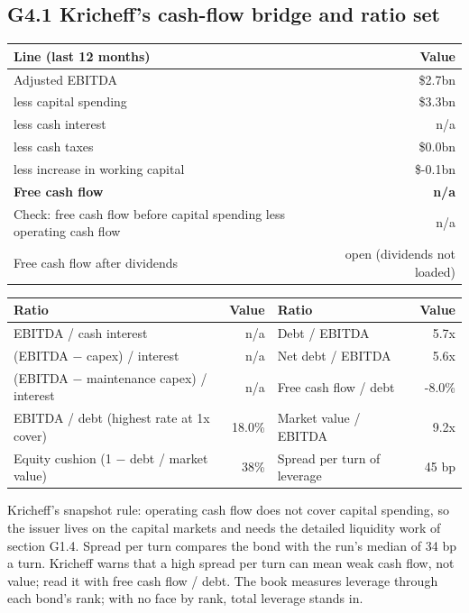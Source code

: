 \documentclass[11pt,a4paper]{article}
\begin{document}
\subsection*{G4.1 Kricheff's cash-flow bridge and ratio set}
\begin{center}\footnotesize\setlength{\tabcolsep}{3.5pt}\begin{tabular}{@{}lr@{}}\toprule
Line (last 12 months) & Value \\\midrule
Adjusted EBITDA & \$2.7bn \\
less capital spending & \$3.3bn \\
less cash interest & n/a \\
less cash taxes & \$0.0bn \\
less increase in working capital & \$-0.1bn \\
\textbf{Free cash flow} & \textbf{n/a} \\
Check: free cash flow before capital spending less operating cash flow & n/a \\
Free cash flow after dividends & open (dividends not loaded) \\
\bottomrule\end{tabular}\end{center}
\begin{center}\footnotesize\setlength{\tabcolsep}{3.5pt}\begin{tabular}{@{}lrlr@{}}\toprule
Ratio & Value & Ratio & Value \\\midrule
EBITDA / cash interest & n/a & Debt / EBITDA & 5.7x \\
(EBITDA $-$ capex) / interest & n/a & Net debt / EBITDA & 5.6x \\
(EBITDA $-$ maintenance capex) / interest & n/a & Free cash flow / debt & -8.0\% \\
EBITDA / debt (highest rate at 1x cover) & 18.0\% & Market value / EBITDA & 9.2x \\
Equity cushion (1 $-$ debt / market value) & 38\% & Spread per turn of leverage & 45 bp \\
\bottomrule\end{tabular}\end{center}
Kricheff's snapshot rule: operating cash flow does not cover capital spending, so the issuer lives on the capital markets and needs the detailed liquidity work of section G1.4. Spread per turn compares the bond with the run's median of 34 bp a turn. Kricheff warns that a high spread per turn can mean weak cash flow, not value; read it with free cash flow / debt. The book measures leverage through each bond's rank; with no face by rank, total leverage stands in.
\end{document}
